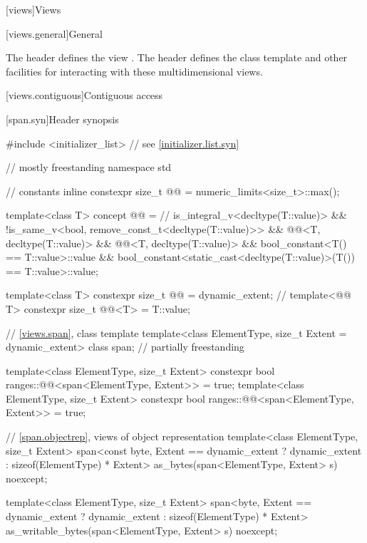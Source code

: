 [views]{Views}

[views.general]{General}

\pnum
The header  defines the view .
The header  defines the class template  and
other facilities for interacting with these multidimensional views.

[views.contiguous]{Contiguous access}

[span.syn]{Header  synopsis}%

%
\begin{codeblock}
#include <initializer_list>     // see \ref{initializer.list.syn}

// mostly freestanding
namespace std {
  // constants
  inline constexpr size_t @@ = numeric_limits<size_t>::max();

  template<class T>
    concept @@ =                    // \expos
      is_integral_v<decltype(T::value)> &&
      !is_same_v<bool, remove_const_t<decltype(T::value)>> &&
      @@<T, decltype(T::value)> &&
      @@<T, decltype(T::value)> &&
      bool_constant<T() == T::value>::value &&
      bool_constant<static_cast<decltype(T::value)>(T()) == T::value>::value;

  template<class T>
    constexpr size_t @@ = dynamic_extent; // \expos
  template<@@ T>
    constexpr size_t @@<T> = {T::value};

  // \ref{views.span}, class template 
  template<class ElementType, size_t Extent = dynamic_extent>
    class span;                                                             // partially freestanding

  template<class ElementType, size_t Extent>
    constexpr bool ranges::@@<span<ElementType, Extent>> = true;
  template<class ElementType, size_t Extent>
    constexpr bool ranges::@@<span<ElementType, Extent>> = true;

  // \ref{span.objectrep}, views of object representation
  template<class ElementType, size_t Extent>
    span<const byte, Extent == dynamic_extent ? dynamic_extent : sizeof(ElementType) * Extent>
      as_bytes(span<ElementType, Extent> s) noexcept;

  template<class ElementType, size_t Extent>
    span<byte, Extent == dynamic_extent ? dynamic_extent : sizeof(ElementType) * Extent>
      as_writable_bytes(span<ElementType, Extent> s) noexcept;
}
\end{codeblock}

